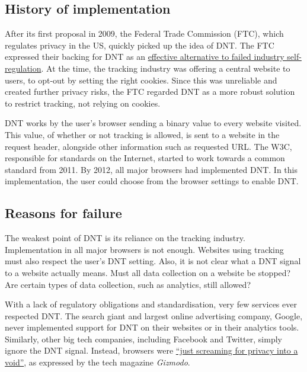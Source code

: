 \documentclass[
]{book}
\begin{document}
\hypertarget{history-of-implementation}{%
\subsection{History of implementation}\label{history-of-implementation}}

After its first proposal in 2009, the Federal Trade Commission (FTC), which regulates privacy in the US, quickly picked up the idea of DNT. The FTC expressed their backing for DNT as an \href{https://www.wired.com/2010/12/ftc-do-not-track/}{effective alternative to failed industry self-regulation}. At the time, the tracking industry was offering a central website to users, to opt-out by setting the right cookies. Since this was unreliable and created further privacy risks, the FTC regarded DNT as a more robust solution to restrict tracking, not relying on cookies.

DNT works by the user's browser sending a binary value to every website visited. This value, of whether or not tracking is allowed, is sent to a website in the request header, alongside other information such as requested URL. The W3C, responsible for standards on the Internet, started to work towards a common standard from 2011. By 2012, all major browsers had implemented DNT. In this implementation, the user could choose from the browser settings to enable DNT.

\hypertarget{reasons-for-failure}{%
\subsection{Reasons for failure}\label{reasons-for-failure}}

The weakest point of DNT is its reliance on the tracking industry. Implementation in all major browsers is not enough. Websites using tracking must also respect the user's DNT setting. Also, it is not clear what a DNT signal to a website actually means. Must all data collection on a website be stopped? Are certain types of data collection, such as analytics, still allowed?

With a lack of regulatory obligations and standardisation, very few services ever respected DNT. The search giant and largest online advertising company, Google, never implemented support for DNT on their websites or in their analytics tools. Similarly, other big tech companies, including Facebook and Twitter, simply ignore the DNT signal. Instead, browsers were \href{https://gizmodo.com/do-not-track-the-privacy-tool-used-by-millions-of-peop-1828868324}{``just screaming for privacy into a void''}, as expressed by the tech magazine \emph{Gizmodo}.
\end{document}

